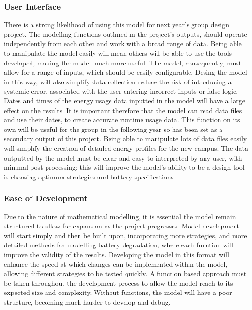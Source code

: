 \subsubsection{User Interface}\label{user-interface}

There is a strong likelihood of using this model for next year's group
design project. The modelling functions outlined in the project's
outputs, should operate independently from each other and work with a
broad range of data. Being able to manipulate the model easily will mean
others will be able to use the tools developed, making the model much
more useful. The model, consequently, must allow for a range of inputs,
which should be easily configurable. Desing the model in this way, will
also simplify data collection reduce the risk of introducing a systemic
error, associated with the user entering incorrect inputs or false
logic. Dates and times of the energy usage data inputted in the model
will have a large effect on the results. It is important therefore that
the model can read data files and use their dates, to create accurate
runtime usage data. This function on its own will be useful for the
group in the following year so has been set as a secondary output of
this project. Being able to manipulate lots of data files easily will
simplify the creation of detailed energy profiles for the new campus.
The data outputted by the model must be clear and easy to interpreted by
any user, with minimal post-processing; this will improve the model's
ability to be a design tool is choosing optimum strategies and battery
specifications.

\subsubsection{Ease of Development}\label{ease-of-development}

Due to the nature of mathematical modelling, it is essential the model
remain structured to allow for expansion as the project progresses.
Model development will start simply and then be built upon,
incorporating more strategies, and more detailed methods for modelling
battery degradation; where each function will improve the validity of
the results. Developing the model in this format will enhance the speed
at which changes can be implemented within the model, allowing different
strategies to be tested quickly. A function based approach must be taken
throughout the development process to allow the model reach to its
expected size and complexity. Without functions, the model will have a
poor structure, becoming much harder to develop and debug.

